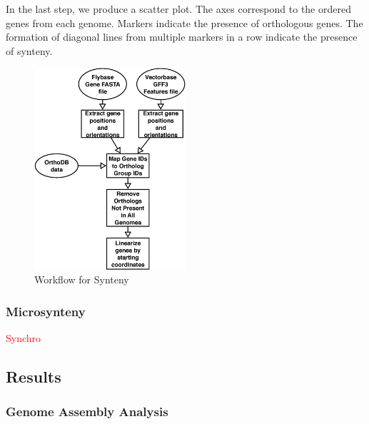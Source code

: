 In the last step, we produce a scatter plot.  The axes correspond to the ordered genes from each genome.  Markers indicate the presence of orthologous genes.  The formation of diagonal lines from multiple markers in a row indicate the presence of synteny.

\begin{figure}[H]
  \centering
  \includegraphics[width=0.5\textwidth]{figures/synteny/orthodb_dotplot_workflow}
  \caption{Workflow for Synteny}
  \label{fig:synteny-workflow}
\end{figure}

\subsubsection{Microsynteny}
\textcolor{red}{Synchro}



\subsection{Results}

\subsubsection{Genome Assembly Analysis}

